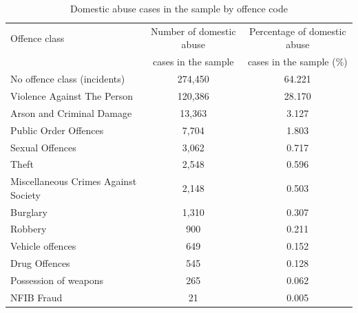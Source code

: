 \documentclass[12pt, a4paper]{article}
\begin{document}
\begin{table}[ht]
\caption{Domestic abuse cases in the sample by offence code}
\label{crimetypes}
\centering
\begin{tabular}{lcc}
  \hline
Offence class & Number of domestic abuse & Percentage of domestic abuse \\
 & cases in the sample & cases in the sample (\%) \\
  \hline
  No offence class (incidents) & 274,450 & 64.221 \\
  Violence Against The Person & 120,386 & 28.170 \\
  Arson and Criminal Damage & 13,363 & 3.127 \\
  Public Order Offences & 7,704 & 1.803 \\
  Sexual Offences & 3,062 & 0.717 \\
  Theft & 2,548 & 0.596 \\
  Miscellaneous Crimes Against Society & 2,148 & 0.503 \\
  Burglary & 1,310 & 0.307 \\
  Robbery &  900 & 0.211 \\
  Vehicle offences &  649 & 0.152 \\
  Drug Offences &  545 & 0.128 \\
  Possession of weapons &  265 & 0.062 \\
  NFIB Fraud &   21 & 0.005 \\
   \hline
\end{tabular}
\end{table}
\end{document}
